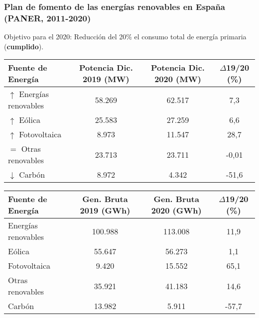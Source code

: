 			\subsubsection{Plan de fomento de las energías renovables en España (PANER, 2011-2020)}
				Objetivo para el 2020: Reducción del 20\% el consumo total de energía primaria (\textbf{cumplido}).
		
				\begin{table}[h]
					\centering
					\begin{tabular}{lccc}
						\hline
						\textbf{Fuente de Energía} & \textbf{Potencia Dic. 2019 (MW)} & \textbf{Potencia Dic. 2020 (MW)} & \textbf{$\Delta$19/20 (\%)} \\
						\hline
						$\uparrow$ Energías renovables & 58.269 & 62.517 & 7,3 \\
						\quad $\uparrow$ Eólica & 25.583 & 27.259 & 6,6 \\
						\quad $\uparrow$ Fotovoltaica & 8.973 & 11.547 & 28,7 \\
						\quad $=$ Otras renovables & 23.713 & 23.711 & -0,01 \\
						$\downarrow$ Carbón & 8.972 & 4.342 & -51,6 \\
						\hline
					\end{tabular}
				\end{table}
				
				\begin{table}[h]
					\centering
					\begin{tabular}{lccc}
						\toprule
						\textbf{Fuente de Energía} & \textbf{Gen. Bruta 2019 (GWh)} & \textbf{Gen. Bruta 2020 (GWh)} & \textbf{$\Delta$19/20 (\%)} \\
						\midrule
						Energías renovables & 100.988 & 113.008 & 11,9 \\
						\quad Eólica & 55.647 & 56.273 & 1,1 \\
						\quad Fotovoltaica & 9.420 & 15.552 & 65,1 \\
						\quad Otras renovables & 35.921 & 41.183 & 14,6 \\
						Carbón & 13.982 & 5.911 & -57,7 \\
						\bottomrule
					\end{tabular}
				\end{table}
				
